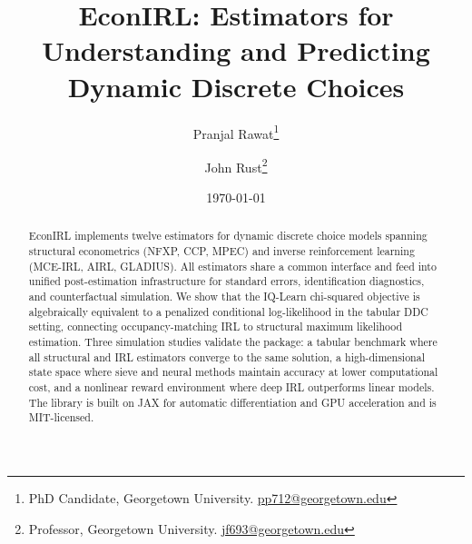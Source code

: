 \documentclass[11pt]{article}
\title{EconIRL: Estimators for Understanding and Predicting\\ Dynamic Discrete Choices}
\author{
  Pranjal Rawat\thanks{PhD Candidate, Georgetown University. \href{mailto:pp712@georgetown.edu}{pp712@georgetown.edu}}
  \and
  John Rust\thanks{Professor, Georgetown University. \href{mailto:jf693@georgetown.edu}{jf693@georgetown.edu}}
}
\date{\today}
\begin{document}
\maketitle

\begin{abstract}
\noindent
EconIRL implements twelve estimators for dynamic discrete choice models spanning structural econometrics (NFXP, CCP, MPEC) and inverse reinforcement learning (MCE-IRL, AIRL, GLADIUS).
All estimators share a common interface and feed into unified post-estimation infrastructure for standard errors, identification diagnostics, and counterfactual simulation.
We show that the IQ-Learn chi-squared objective is algebraically equivalent to a penalized conditional log-likelihood in the tabular DDC setting, connecting occupancy-matching IRL to structural maximum likelihood estimation.
Three simulation studies validate the package: a tabular benchmark where all structural and IRL estimators converge to the same solution, a high-dimensional state space where sieve and neural methods maintain accuracy at lower computational cost, and a nonlinear reward environment where deep IRL outperforms linear models.
The library is built on JAX for automatic differentiation and GPU acceleration and is MIT-licensed.
\end{abstract}

\bigskip












\appendix

\end{document}
